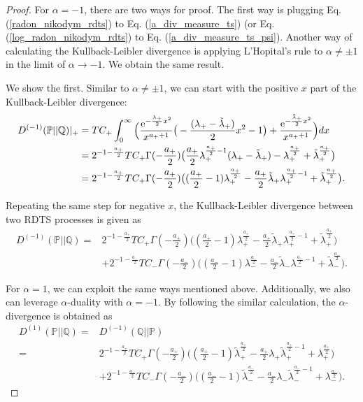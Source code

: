 \documentclass[preprint,11pt]{amsart}
\begin{document}
\begin{proof}
	For $\alpha=-1$, there are two ways for proof. The first way is plugging Eq. (\ref{radon_nikodym_rdts}) to Eq. (\ref{a_div_measure_ts}) (or Eq. (\ref{log_radon_nikodym_rdts}) to Eq. (\ref{a_div_measure_ts_psi}). Another way of calculating the Kullback-Leibler divergence is applying L'Hopital's rule to $\alpha \neq \pm1$ in the limit of $\alpha\to-1$. We obtain the same result.
	
	We show the first. Similar to $\alpha \neq \pm1$, we can start with the positive $x$ part of the Kullback-Leibler divergence:
	\begin{align}
	D^{(-1)}(\mathbb{P}||\mathbb{Q})|_{+}&=TC_+\int_0^\infty \Big(\frac{{\rm e}^{-\frac{\lambda_+}{2}x^2}}{x^{a_++1}}\big(-\frac{(\lambda_+-\tilde{\lambda}_+)}{2}x^2-1\big) + \frac{{\rm e}^{-\frac{\tilde{\lambda}_+}{2}x^2}}{x^{a_++1}}\Big)dx\nonumber\\
	&=2^{-1-\frac{a_+}{2}}TC_+\Gamma(-\frac{a_+}{2})\big(\frac{a_+}{2}\lambda_+^{\frac{a_+}{2}-1}(\lambda_+-\tilde{\lambda}_+)-\lambda_+^{\frac{a_+}{2}}+\tilde{\lambda}_+^{\frac{a_+}{2}}\big)\nonumber\\
	&=2^{-1-\frac{a_+}{2}}TC_+\Gamma(-\frac{a_+}{2})\big((\frac{a_+}{2}-1)\lambda_+^{\frac{a_+}{2}}-\frac{a_+}{2}\tilde{\lambda}_+\lambda_+^{\frac{a_+}{2}-1}+\tilde{\lambda}_+^{\frac{a_+}{2}}\big).\nonumber
	\end{align}
	
	Repeating the same step for negative $x$, the Kullback-Leibler divergence between two RDTS processes is given as
	\begin{align}
	D^{(-1)}(\mathbb{P}||\mathbb{Q})=&2^{-1-\frac{a_+}{2}}TC_+\Gamma(-\frac{a_+}{2})\big((\frac{a_+}{2}-1)\lambda_+^{\frac{a_+}{2}}-\frac{a_+}{2}\tilde{\lambda}_+\lambda_+^{\frac{a_+}{2}-1}+\tilde{\lambda}_+^{\frac{a_+}{2}}\big)\nonumber\\
	&+2^{-1-\frac{a_-}{2}}TC_-\Gamma(-\frac{a_-}{2})\big((\frac{a_-}{2}-1)\lambda_-^{\frac{a_-}{2}}-\frac{a_-}{2}\tilde{\lambda}_-\lambda_-^{\frac{a_-}{2}-1}+\tilde{\lambda}_-^{\frac{a_-}{2}}\big).\nonumber
	\end{align}
		
	For $\alpha=1$, we can exploit the same ways mentioned above. Additionally, we also can leverage $\alpha$-duality with $\alpha=-1$. By following the similar calculation, the $\alpha$-divergence is obtained as
	\begin{align}
	D^{(1)}(\mathbb{P}||\mathbb{Q})=&D^{(-1)}(\mathbb{Q}||\mathbb{P})\nonumber\\
	=&2^{-1-\frac{a_+}{2}}TC_+\Gamma(-\frac{a_+}{2})\big((\frac{a_+}{2}-1)\tilde{\lambda}_+^{\frac{a_+}{2}}-\frac{a_+}{2}\lambda_+\tilde{\lambda}_+^{\frac{a_+}{2}-1}+\lambda_+^{\frac{a_+}{2}}\big)\nonumber\\
	&+2^{-1-\frac{a_-}{2}}TC_-\Gamma(-\frac{a_-}{2})\big((\frac{a_-}{2}-1)\tilde{\lambda}_-^{\frac{a_-}{2}}-\frac{a_-}{2}\lambda_-\tilde{\lambda}_-^{\frac{a_-}{2}-1}+\lambda_-^{\frac{a_-}{2}}\big)\nonumber.
	\end{align}
	\end{proof}
	
\end{document}
